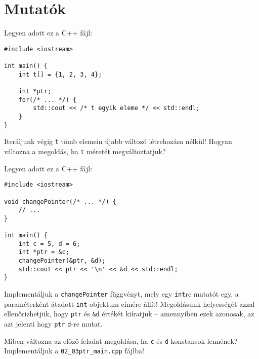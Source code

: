 \documentclass[../exercise_book/exercise_book.tex]{subfiles}
\begin{document}
	\section{Mutatók}
	
	\begin{exercise}
		Legyen adott ez a C++ fájl:
		
		\smallskip
		\begin{lstlisting}
#include <iostream>

int main() {
	int t[] = {1, 2, 3, 4};
	
	int *ptr;
	for(/* ... */) {
		std::cout << /* t egyik eleme */ << std::endl;
	}
}
		\end{lstlisting}
		Iteráljunk végig \texttt{t} tömb elemein újabb változó létrehozása nélkül! Hogyan változna a megoldás, ha \texttt{t} méretét megváltoztatjuk?
	\end{exercise}
	\begin{exercise}
		Legyen adott ez a C++ fájl:
		
		\smallskip
		\fbox{\textbf{02\_02ptr\_main.cpp}}
		\begin{lstlisting}
#include <iostream>

void changePointer(/* ... */) {
	// ...
}

int main() {
	int c = 5, d = 6;
	int *ptr = &c;
	changePointer(&ptr, &d);
	std::cout << ptr << '\n' << &d << std::endl;
}
		\end{lstlisting}
		Implementáljuk a \texttt{changePointer} függvényt, mely egy \texttt{int}re mutatót egy, a paraméterként átadott \texttt{int} objektum címére állít! Megoldásunk helyességét azzal ellenőrizhetjük, hogy \texttt{ptr} és \texttt{\&d} értékét kiíratjuk -- amennyiben ezek azonosak, az azt jelenti hogy \texttt{ptr} \texttt{d}-re mutat.
	\end{exercise}
	\begin{exercise}
		Miben változna az előző feladat megoldása, ha \texttt{c} és \texttt{d} konstansok lennének? Implementáljuk a \texttt{02\_03ptr\_main.cpp} fájlba!
	\end{exercise}
\end{document}
